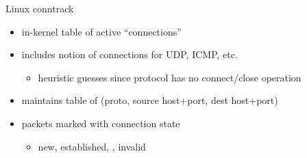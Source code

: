\begin{frame}{Linux conntrack}
    \begin{itemize}
    \item in-kernel table of active ``connections''
    \item includes notion of connections for UDP, ICMP, etc.
        \begin{itemize}
        \item heuristic guesses since protocol has no connect/close operation
        \end{itemize}
    \item maintains table of (proto, source host+port, dest host+port)
    \item packets marked with connection state
        \begin{itemize}
        \item new, established, , invalid
        \end{itemize}
    \end{itemize}
\end{frame}
